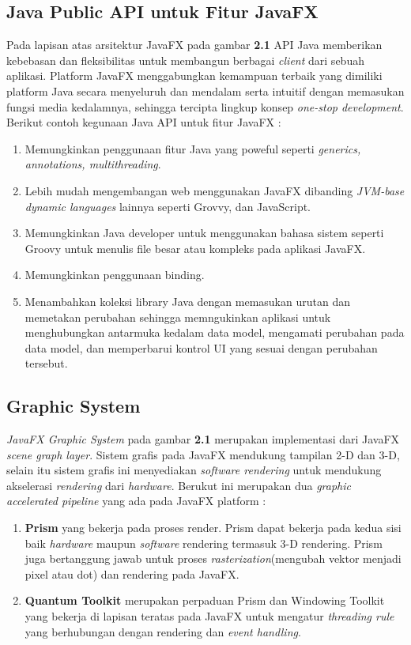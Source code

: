 \subsection{Java Public API untuk Fitur JavaFX}
\label{subs:API}
Pada lapisan atas arsitektur JavaFX pada gambar \textbf{2.1} API Java memberikan kebebasan dan fleksibilitas untuk membangun berbagai \textit{client} dari sebuah aplikasi. Platform JavaFX menggabungkan kemampuan terbaik yang dimiliki platform Java secara menyeluruh dan mendalam serta intuitif dengan memasukan fungsi media kedalamnya, sehingga tercipta lingkup konsep \textit{one-stop development}. Berikut contoh kegunaan Java API untuk fitur JavaFX :\cite{javafx}
\begin{enumerate}
	\item Memungkinkan penggunaan fitur Java yang poweful seperti \textit{generics, annotations, multithreading}.
	\item Lebih mudah mengembangan web menggunakan JavaFX dibanding \textit{JVM-base dynamic languages} lainnya seperti Grovvy, dan JavaScript.
	\item Memungkinkan Java developer untuk menggunakan bahasa sistem seperti Groovy untuk menulis file besar atau kompleks pada aplikasi JavaFX.
	\item Memungkinkan penggunaan binding.
	\item Menambahkan koleksi library Java dengan memasukan urutan dan memetakan perubahan sehingga memngukinkan aplikasi untuk menghubungkan antarmuka kedalam data model, mengamati perubahan pada data model, dan memperbarui kontrol UI yang sesuai dengan perubahan tersebut.   
\end{enumerate}

\subsection{Graphic System}
\label{subs:Graphic_System}
\textit{JavaFX Graphic System} pada gambar \textbf{2.1} merupakan implementasi dari JavaFX \textit{scene graph layer}. Sistem grafis pada JavaFX mendukung tampilan 2-D dan 3-D, selain itu sistem grafis ini menyediakan \textit{software rendering} untuk mendukung akselerasi \textit{rendering} dari \textit{hardware}. Berukut ini merupakan dua \textit{graphic accelerated pipeline} yang ada pada JavaFX platform :\cite{javafx}
\begin{enumerate}
	\item \textbf{Prism} yang bekerja pada proses render. Prism dapat bekerja pada kedua sisi baik \textit{hardware} maupun \textit{software} rendering termasuk 3-D rendering. Prism juga bertanggung jawab untuk proses \textit{rasterization}(mengubah vektor menjadi pixel atau dot) dan rendering pada JavaFX.
	\item \textbf{Quantum Toolkit} merupakan perpaduan Prism dan Windowing Toolkit yang bekerja di lapisan teratas pada JavaFX untuk mengatur \textit{threading rule} yang berhubungan dengan rendering dan \textit{event handling}. 
\end{enumerate}

